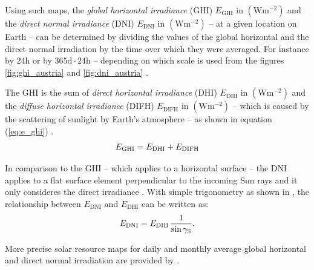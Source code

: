 Using such maps, the \emph{global horizontal irradiance} (GHI) $E_{\mathrm{GHI}}$ in $\left( \mathrm{W}\mathrm{m}^{-2} \right)$ and the \emph{direct normal irradiance} (DNI) $E_{\mathrm{DNI}}$ in $\left( \mathrm{W}\mathrm{m}^{-2} \right)$ -- at a given location on Earth -- can be determined by dividing the values of the global horizontal and the direct normal irradiation by the time over which they were averaged. For instance by $24\mathrm{h}$ or by $365\mathrm{d} \cdot 24\mathrm{h}$ -- depending on which scale is used from the figures \ref{fig:ghi_austria} and \ref{fig:dni_austria} \cite{Mertens:2015, SolargisData:2020}.

The GHI is the sum of \emph{direct horizontal irradiance} (DHI) $E_{\mathrm{DHI}}$ in $\left( \mathrm{W}\mathrm{m}^{-2} \right)$ and the \emph{diffuse horizontal irradiance} (DIFH) $E_{\mathrm{DIFH}}$ in $\left( \mathrm{W} \mathrm{m}^{-2} \right)$ -- which is caused by the scattering of sunlight by Earth's atmosphere -- as shown in equation (\ref{eq:e_ghi}) \cite{Mertens:2015, SolarRadiationModeling:2020}.
	\begin{equation} \label{eq:e_ghi}
	\centering
		E_{\mathrm{GHI}} = E_{\mathrm{DHI}} + E_{\mathrm{DIFH}}
	\end{equation}

In comparison to the GHI -- which applies to a horizontal surface -- the DNI applies to a flat surface element perpendicular to the incoming Sun rays and it only consideres the direct irradiance \cite{Mertens:2015, SolarRadiationModeling:2020}. With simple trigonometry as shown in \cite{Mertens:2015}, the relationship between $E_{\mathrm{DNI}}$ and $E_{\mathrm{DHI}}$ can be written as:
	\begin{equation} \label{eq:e_dni}
	\centering
		E_{\mathrm{DNI}} = E_{\mathrm{DHI}} \, \frac{1}{\sin \gamma_{\mathrm{S}}} \text{.}
	\end{equation}

More precise solar resource maps for daily and monthly average global horizontal and direct normal irradiation are provided by \cite{Union:2020}.
